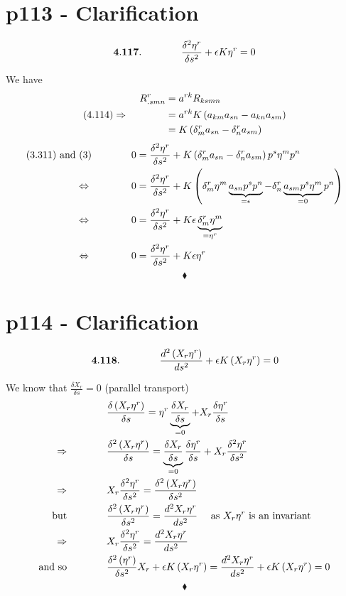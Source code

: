 \section{p113 - Clarification}
\begin{tcolorbox}
$$\mathbf{4.117.}\quad\quad\quad\quad \frac{\delta^2 \eta^r}{\delta s^2} + \epsilon K\eta^r =0$$
\end{tcolorbox}
We have
\begin{align}
R^r_{.smn} &= a^{rk} R_{ksmn}\\
\text{(4.114)}\Rightarrow \quad\quad\quad\quad &= a^{rk} K\left(a_{km}a_{sn}-a_{kn}a_{sm}\right)\\
&= K\left(\delta^r_m a_{sn}-\delta^r_n a_{sm}\right)
\end{align}
\begin{align*}
\text{(3.311) and (3)}\quad\quad\quad\quad 0 &=\frac{\delta^2 \eta^r}{\delta s^2} +  K\left(\delta^r_m a_{sn}-\delta^r_n a_{sm}\right)p^s\eta^m p^n\\
\Leftrightarrow\quad\quad\quad\quad 0 &=\frac{\delta^2 \eta^r}{\delta s^2} +  K\left(\delta^r_m \eta^m \underbrace{a_{sn}p^s p^n}_{=\epsilon}-\delta^r_n \underbrace{a_{sm}p^s\eta^m}_{=0} p^n\right)\\
\Leftrightarrow\quad\quad\quad\quad 0 &=\frac{\delta^2 \eta^r}{\delta s^2} +  K\epsilon\underbrace{\delta^r_m \eta^m}_{=\eta^r} \\
\Leftrightarrow\quad\quad\quad\quad 0 &=\frac{\delta^2 \eta^r}{\delta s^2} +  K\epsilon\eta^r
\end{align*}
$$\blacklozenge$$
\newpage

\section{p114 - Clarification}
\begin{tcolorbox}
$$\mathbf{4.118.}\quad\quad\quad\quad \dv[2]{\left(X_r\eta^r\right)}{s} + \epsilon K\left(X_r\eta^r\right) =0$$
\end{tcolorbox}
We know that $\frac{\delta X_r}{\delta s} = 0$ (parallel transport)
\begin{align*}
&\frac{\delta \left(X_r\eta^r\right)}{\delta s}= \eta^r\underbrace{\frac{\delta X_r}{\delta s}}_{=0}+X_r\frac{\delta \eta^r}{\delta s}\\
\Rightarrow\quad\quad\quad\quad &\frac{\delta^2 \left(X_r\eta^r\right)}{\delta s}= \underbrace{\frac{\delta X_r}{\delta s}}_{=0}\frac{\delta \eta^r}{\delta s}+X_r\frac{\delta^2 \eta^r}{\delta s^2}\\
\Rightarrow\quad\quad\quad\quad &X_r\frac{\delta^2 \eta^r}{\delta s^2}= \frac{\delta^2 \left(X_r\eta^r\right)}{\delta s^2}\\
\text{but}\quad\quad\quad\quad &\frac{\delta^2 \left(X_r\eta^r\right)}{\delta s^2} =  \dv[2]{X_r\eta^r}{s} \quad \text{ as } X_r\eta^r \text{ is an invariant}\\
\Rightarrow \quad\quad\quad\quad &X_r\frac{\delta^2 \eta^r}{\delta s^2}=\dv[2]{X_r\eta^r}{s}\\
\text{and so}\quad\quad\quad\quad &\frac{\delta^2 \left(\eta^r\right)}{\delta s^2}X_r + \epsilon K\left(X_r\eta^r\right) = \dv[2]{X_r\eta^r}{s}+ \epsilon K\left(X_r\eta^r\right) = 0
\end{align*}
$$\blacklozenge$$
\newpage

